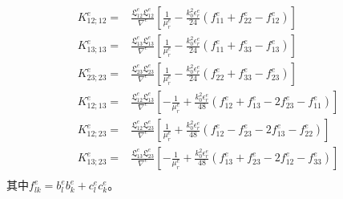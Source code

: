 \documentclass{article}
\numberwithin{equation}{section}
\begin{document}
\begin{align}
    \label{eq:eq766}
    K_{12;12}^e=&\frac{\mathfrak{L}_{12}^e\mathfrak{L}_{12}^e}{\nabla^e}\left[\frac{1}{\mu_r^e}-\frac{k_0^2\epsilon_r^e}{24}\left(f_{11}^e+f_{22}^e-f_{12}^e\right)\right] \\
    K_{13;13}^e=&\frac{\mathfrak{L}_{13}^e\mathfrak{L}_{13}^e}{\nabla^e}\left[\frac{1}{\mu_r^e}-\frac{k_0^2\epsilon_r^e}{24}\left(f_{11}^e+f_{33}^e-f_{13}^e\right)\right] \\
    K_{23;23}^e=&\frac{\mathfrak{L}_{23}^e\mathfrak{L}_{23}^e}{\nabla^e}\left[\frac{1}{\mu_r^e}-\frac{k_0^2\epsilon_r^e}{24}\left(f_{22}^e+f_{33}^e-f_{23}^e\right)\right] \\
    K_{12;13}^e=&\frac{\mathfrak{L}_{12}^e\mathfrak{L}_{13}^e}{\nabla^e}\left[-\frac{1}{\mu_r^e}+\frac{k_0^2\epsilon_r^e}{48}\left(f_{12}^e+f_{13}^e-2f_{23}^e-f_{11}^e\right)\right] \\
    K_{12;23}^e=&\frac{\mathfrak{L}_{12}^e\mathfrak{L}_{23}^e}{\nabla^e}\left[\frac{1}{\mu_r^e}+\frac{k_0^2\epsilon_r^e}{48}\left(f_{12}^e-f_{23}^e-2f_{13}^e-f_{22}^e\right)\right] \\
    K_{13;23}^e=&\frac{\mathfrak{L}_{13}^e\mathfrak{L}_{23}^e}{\nabla^e}\left[-\frac{1}{\mu_r^e}+\frac{k_0^2\epsilon_r^e}{48}\left(f_{13}^e+f_{23}^e-2f_{12}^e-f_{33}^e\right)\right] \\
\end{align}
其中$f_{lk}^e=b_l^eb_k^e+c_l^ec_k^e$。
\end{document}
